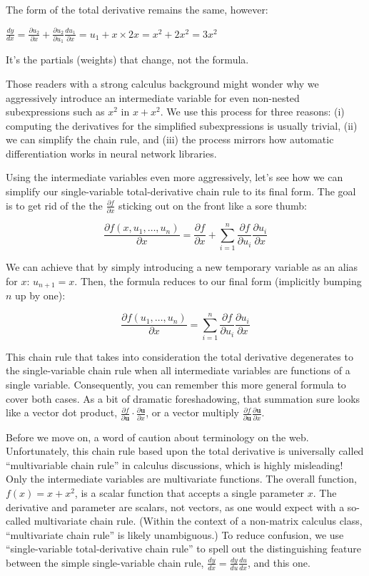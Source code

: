 \documentclass[11pt]{article}
\begin{document}
The form of the total derivative remains the same, however:

$\frac{dy}{dx} = \frac{\partial u_2}{\partial x} + \frac{\partial u_2}{\partial u_1}\frac{d u_1}{\partial  x} = u_1 + x \times 2x = x^2 + 2x^2 = 3x^2$

It's the partials (weights) that change, not the formula.

Those readers with a strong calculus background might wonder why we aggressively introduce an intermediate variable for even non-nested subexpressions such as $x^2$ in $x+x^2$. We use this process for three reasons: (i) computing the derivatives for the simplified subexpressions is usually trivial, (ii) we can simplify the chain rule, and (iii) the process mirrors how automatic differentiation works in neural network libraries.

Using the intermediate variables even more aggressively, let's see how we can simplify our single-variable total-derivative chain rule to its final form. The goal is to get rid of the the $\frac{\partial f}{\partial x}$ sticking out on the front like a sore thumb:

\[
\frac{\partial f(x,u_1,\ldots,u_n)}{\partial x} = \frac{\partial f}{\partial x} + \sum_{i=1}^n \frac{\partial f}{\partial u_i}\frac{\partial  u_i}{\partial  x}
\]

We can achieve that by simply introducing a new temporary variable as an alias for $x$: $u_{n+1} = x$. Then, the formula reduces to our final form (implicitly bumping $n$ up by one):

\[
\frac{\partial f(u_1,\ldots,u_n)}{\partial x} = \sum_{i=1}^n \frac{\partial f}{\partial u_i}\frac{\partial  u_i}{\partial  x}
\]

This chain rule that takes into consideration the total derivative degenerates to the single-variable chain rule when all intermediate variables are functions of a single variable.   Consequently, you can remember this more general formula to cover both cases.  As a bit of dramatic foreshadowing, that summation sure looks like a vector dot product, $\frac{\partial f}{\partial \mathbf{u}} \cdot \frac{\partial \mathbf{u}}{\partial x}$, or  a vector multiply $\frac{\partial f}{\partial \mathbf{u}} \frac{\partial \mathbf{u}}{\partial x}$. 
 
Before we move on, a word of caution about terminology on the web. Unfortunately, this chain rule based upon the total derivative is universally called ``multivariable chain rule'' in calculus discussions, which is highly misleading! Only the intermediate variables are multivariate functions. The overall function, $f(x) = x + x^2$, is a scalar function that accepts a single parameter $x$. The derivative and parameter are scalars, not vectors, as one would expect with a so-called multivariate chain rule.  (Within the context of a non-matrix calculus class, ``multivariate chain rule'' is likely unambiguous.) To reduce confusion, we use ``single-variable total-derivative chain rule'' to spell out the distinguishing feature between the simple single-variable chain rule, $\frac{dy}{dx} = \frac{dy}{du}\frac{du}{dx}$, and this one. 
\end{document}
